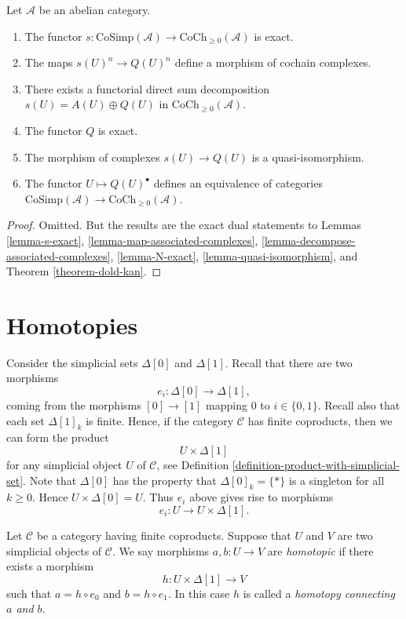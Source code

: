 \begin{lemma}
\label{lemma-dual-dold-kan}
Let $\mathcal{A}$ be an abelian category.
\begin{enumerate}
\item The functor
$s : \text{CoSimp}(\mathcal{A}) \to \text{CoCh}_{\geq 0}(\mathcal{A})$
is exact.
\item The maps $s(U)^n \to Q(U)^n$ define a morphism
of cochain complexes.
\item There exists a functorial direct sum decomposition
$s(U) = A(U) \oplus Q(U)$ in $\text{CoCh}_{\geq 0}(\mathcal{A})$.
\item The functor $Q$ is exact.
\item The morphism of complexes $s(U) \to Q(U)$ is a quasi-isomorphism.
\item The functor $U \mapsto Q(U)^\bullet$ defines
an equivalence of categories 
$\text{CoSimp}(\mathcal{A}) \to \text{CoCh}_{\geq 0}(\mathcal{A})$.
\end{enumerate}
\end{lemma}

\begin{proof}
Omitted. But the results are the exact dual statements to
Lemmas \ref{lemma-s-exact}, \ref{lemma-map-associated-complexes},
\ref{lemma-decompose-associated-complexes},
\ref{lemma-N-exact}, \ref{lemma-quasi-isomorphism}, and
Theorem \ref{theorem-dold-kan}.
\end{proof}

\section{Homotopies}
\label{section-homotopy}

\noindent
Consider the simplicial sets $\Delta[0]$ and $\Delta[1]$.
Recall that there are two morphisms
$$
e_i : \Delta[0] \longrightarrow \Delta[1],
$$
coming from the morphisms $[0] \to [1]$ mapping 
$0$ to $i \in \{0, 1\}$. Recall also that each
set $\Delta[1]_k$ is finite. Hence, if the category
$\mathcal{C}$ has finite coproducts, then we can
form the product
$$
U \times \Delta[1]
$$
for any simplicial object $U$ of $\mathcal{C}$, see
Definition \ref{definition-product-with-simplicial-set}.
Note that $\Delta[0]$ has the property that $\Delta[0]_k = \{*\}$
is a singleton for all $k \geq 0$. Hence $U \times \Delta[0]
= U$. Thus $e_i$ above gives rise to morphisms
$$
e_i : U \to U \times \Delta[1].
$$

\begin{definition}
\label{definition-homotopy}
Let $\mathcal{C}$ be a category having finite coproducts.
Suppose that $U$ and $V$ are two simplicial objects
of $\mathcal{C}$.
We say morphisms $a, b : U \to V$ are {\it homotopic}
if there exists a morphism
$$
h : U \times \Delta[1] \longrightarrow V
$$
such that $a = h \circ e_0$ and $b = h \circ e_1$.
In this case $h$ is called a {\it homotopy connecting
$a$ and $b$}.
\end{definition}

